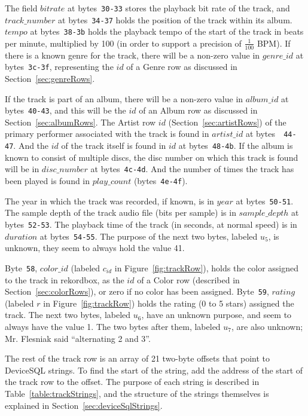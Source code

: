 \documentclass[11pt]{article}
\begin{document}
The field $bitrate$ at bytes~{\tt 30-33} stores the playback bit rate
of the track, and $track\_number$ at bytes~{\tt 34-37} holds the
position of the track within its album. $tempo$ at bytes~{\tt 38-3b}
holds the playback tempo of the start of the track in beats per
minute, multiplied by 100 (in order to support a precision of
$\frac{1}{100}$ BPM). If there is a known genre for the track, there
will be a non-zero value in $genre\_id$ at bytes~{\tt 3c-3f},
representing the $id$ of a Genre row as discussed in
Section~\ref{sec:genreRows}.

If the track is part of an album, there will be a non-zero value in
$album\_id$ at bytes~{\tt 40-43}, and this will be the $id$ of an
Album row as discussed in Section~\ref{sec:albumRows}. The Artist row
$id$ (Section~\ref{sec:artistRows}) of the primary performer
associated with the track is found in $artist\_id$ at bytes~{\tt
  44-47}. And the $id$ of the track itself is found in $id$ at
bytes~{\tt 48-4b}. If the album is known to consist of multiple discs,
the disc number on which this track is found will be in $disc\_number$
at bytes~{\tt 4c-4d}. And the number of times the track has been
played is found in $play\_count$ (bytes~{\tt 4e-4f}).

The year in which the track was recorded, if known, is in $year$ at
bytes~{\tt 50-51}. The sample depth of the track audio file (bits per
sample) is in $sample\_depth$ at bytes~{\tt 52-53}. The playback time
of the track (in seconds, at normal speed) is in $duration$ at
bytes~{\tt 54-55}. The purpose of the next two bytes, labeled $u_5$,
is unknown, they seem to always hold the value 41.

Byte~{\tt 58}, $color\_id$ (labeled $c_{id}$ in
Figure~\ref{fig:trackRow}), holds the color assigned to the track in
rekordbox, as the $id$ of a Color row (described in
Section~\ref{sec:colorRows}), or zero if no color has been assigned.
Byte~{\tt 59}, $rating$ (labeled $r$ in Figure~\ref{fig:trackRow})
holds the rating (0 to 5 stars) assigned the track. The next two
bytes, labeled $u_6$, have an unknown purpose, and seem to always have
the value 1. The two bytes after them, labeled $u_7$, are also
unknown; Mr. Flesniak said ``alternating 2 and 3''.

The rest of the track row is an array of 21 two-byte offsets that
point to DeviceSQL strings. To find the start of the string, add the
address of the start of the track row to the offset. The purpose of
each string is described in Table~\ref{table:trackStrings}, and the
structure of the strings themselves is explained in
Section~\ref{sec:deviceSqlStrings}.
\end{document}
